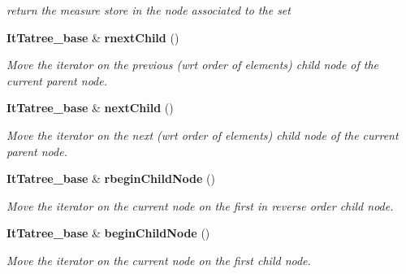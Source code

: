 \begin{CompactItemize}
\begin{CompactList}\small\item\em return the measure store in the node associated to the set \item\end{CompactList}\item 
{\bf It\-Tatree\_\-base} \& {\bf rnext\-Child} ()
\begin{CompactList}\small\item\em Move the iterator on the previous (wrt order of elements) child node of the current parent node. \item\end{CompactList}\item 
{\bf It\-Tatree\_\-base} \& {\bf next\-Child} ()
\begin{CompactList}\small\item\em Move the iterator on the next (wrt order of elements) child node of the current parent node. \item\end{CompactList}\item 
{\bf It\-Tatree\_\-base} \& {\bf rbegin\-Child\-Node} ()
\begin{CompactList}\small\item\em Move the iterator on the current node on the first in reverse order child node. \item\end{CompactList}\item 
{\bf It\-Tatree\_\-base} \& {\bf begin\-Child\-Node} ()
\begin{CompactList}\small\item\em Move the iterator on the current node on the first child node. \item\end{CompactList}\end{CompactItemize}
